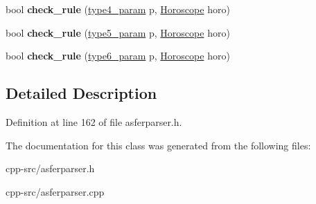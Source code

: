 \begin{DoxyCompactItemize}
\item 
\hypertarget{classasferparser_a20a0cc502bcdcf68ae891eefa061b39d}{bool {\bfseries check\-\_\-rule} (\hyperlink{structtype4__param}{type4\-\_\-param} p, \hyperlink{structHoroscope}{Horoscope} horo)}\label{classasferparser_a20a0cc502bcdcf68ae891eefa061b39d}

\item 
\hypertarget{classasferparser_afafa41350a7570d7b0e436a7f1739fe0}{bool {\bfseries check\-\_\-rule} (\hyperlink{structtype5__param}{type5\-\_\-param} p, \hyperlink{structHoroscope}{Horoscope} horo)}\label{classasferparser_afafa41350a7570d7b0e436a7f1739fe0}

\item 
\hypertarget{classasferparser_aeae75fde9f8255287e72a1f4183b61c5}{bool {\bfseries check\-\_\-rule} (\hyperlink{structtype6__param}{type6\-\_\-param} p, \hyperlink{structHoroscope}{Horoscope} horo)}\label{classasferparser_aeae75fde9f8255287e72a1f4183b61c5}

\end{DoxyCompactItemize}


\subsection{Detailed Description}


Definition at line 162 of file asferparser.\-h.



The documentation for this class was generated from the following files\-:\begin{DoxyCompactItemize}
\item 
cpp-\/src/asferparser.\-h\item 
cpp-\/src/asferparser.\-cpp\end{DoxyCompactItemize}
